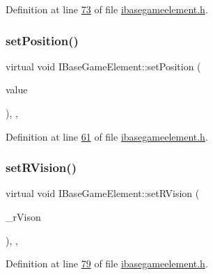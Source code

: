 Definition at line \hyperlink{a00047_source_l00073}{73} of file \hyperlink{a00047_source}{ibasegameelement.\+h}.

\mbox{\label{a00137_a54dc1a743fac99db03c3f47b5c6d69c4}} 
\subsubsection{\texorpdfstring{set\+Position()}{setPosition()}}
{\footnotesize\ttfamily virtual void I\+Base\+Game\+Element\+::set\+Position (\begin{DoxyParamCaption}\item[{Q\+Vector3D $\ast$}]{value }\end{DoxyParamCaption})\hspace{0.3cm}{\ttfamily [inline]}, {\ttfamily [virtual]}, {\ttfamily [inherited]}}



Definition at line \hyperlink{a00047_source_l00061}{61} of file \hyperlink{a00047_source}{ibasegameelement.\+h}.

\mbox{\label{a00137_a2719e14051c30f39ca60f4998e48abf9}} 
\subsubsection{\texorpdfstring{set\+R\+Vision()}{setRVision()}}
{\footnotesize\ttfamily virtual void I\+Base\+Game\+Element\+::set\+R\+Vision (\begin{DoxyParamCaption}\item[{int}]{\+\_\+r\+Vison }\end{DoxyParamCaption})\hspace{0.3cm}{\ttfamily [inline]}, {\ttfamily [virtual]}, {\ttfamily [inherited]}}



Definition at line \hyperlink{a00047_source_l00079}{79} of file \hyperlink{a00047_source}{ibasegameelement.\+h}.

\mbox{\label{a00137_ac480b8140b5b290f49b4b96a47291180}} 
